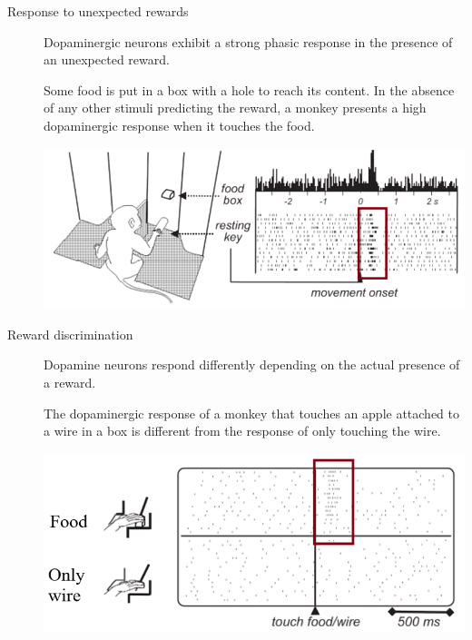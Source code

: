 \begin{description}
    \item[Response to unexpected rewards] 
        Dopaminergic neurons exhibit a strong phasic response in the presence of an unexpected reward.

        \begin{@empty}
            \small
            \begin{example}
                Some food is put in a box with a hole to reach its content.
                In the absence of any other stimuli predicting the reward, 
                a monkey presents a high dopaminergic response when it touches the food.
                \begin{center}
                    \includegraphics[width=0.55\linewidth]{./img/dopamine_monkey1.png}    
                \end{center}
            \end{example}
        \end{@empty}

    \item[Reward discrimination] 
        Dopamine neurons respond differently depending on the actual presence of a reward.

        \begin{@empty}
            \small
            \begin{example}
                The dopaminergic response of a monkey that touches an apple attached to a wire in a box is different 
                from the response of only touching the wire.
                \begin{center}
                    \includegraphics[width=0.5\linewidth]{./img/dopamine_monkey2.png}    
                \end{center}
            \end{example}
        \end{@empty}


\end{description}
